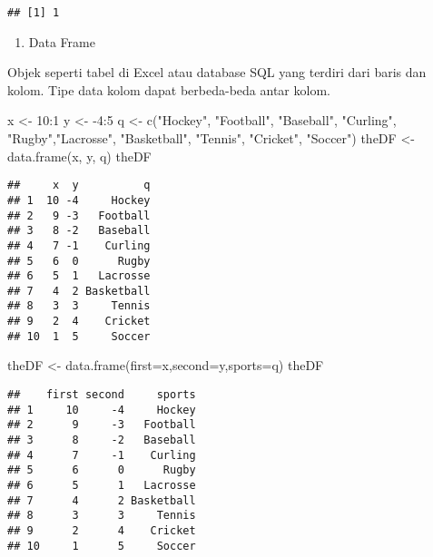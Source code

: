 \documentclass[
]{book}
\newenvironment{Shaded}{\begin{snugshade}}{\end{snugshade}}
\newcommand{\AttributeTok}[1]{\textcolor[rgb]{0.77,0.63,0.00}{#1}}
\newcommand{\DecValTok}[1]{\textcolor[rgb]{0.00,0.00,0.81}{#1}}
\newcommand{\FunctionTok}[1]{\textcolor[rgb]{0.00,0.00,0.00}{#1}}
\newcommand{\NormalTok}[1]{#1}
\newcommand{\OtherTok}[1]{\textcolor[rgb]{0.56,0.35,0.01}{#1}}
\newcommand{\SpecialCharTok}[1]{\textcolor[rgb]{0.00,0.00,0.00}{#1}}
\newcommand{\StringTok}[1]{\textcolor[rgb]{0.31,0.60,0.02}{#1}}
\providecommand{\tightlist}{%
  \setlength{\itemsep}{0pt}\setlength{\parskip}{0pt}}
\begin{document}
\begin{verbatim}
## [1] 1
\end{verbatim}

\begin{enumerate}
\def\labelenumi{\arabic{enumi}.}
\setcounter{enumi}{4}
\tightlist
\item
  Data Frame
\end{enumerate}

Objek seperti tabel di Excel atau database SQL yang terdiri dari baris dan kolom. Tipe data kolom dapat berbeda-beda antar kolom.

\begin{Shaded}
\begin{Highlighting}[]
\NormalTok{x }\OtherTok{\textless{}{-}} \DecValTok{10}\SpecialCharTok{:}\DecValTok{1}
\NormalTok{y }\OtherTok{\textless{}{-}} \SpecialCharTok{{-}}\DecValTok{4}\SpecialCharTok{:}\DecValTok{5}
\NormalTok{q }\OtherTok{\textless{}{-}} \FunctionTok{c}\NormalTok{(}\StringTok{"Hockey"}\NormalTok{, }\StringTok{"Football"}\NormalTok{, }\StringTok{"Baseball"}\NormalTok{, }\StringTok{"Curling"}\NormalTok{, }\StringTok{"Rugby"}\NormalTok{,}\StringTok{"Lacrosse"}\NormalTok{, }\StringTok{"Basketball"}\NormalTok{, }\StringTok{"Tennis"}\NormalTok{, }\StringTok{"Cricket"}\NormalTok{, }\StringTok{"Soccer"}\NormalTok{)}
\NormalTok{theDF }\OtherTok{\textless{}{-}} \FunctionTok{data.frame}\NormalTok{(x, y, q)}
\NormalTok{theDF}
\end{Highlighting}
\end{Shaded}

\begin{verbatim}
##     x  y          q
## 1  10 -4     Hockey
## 2   9 -3   Football
## 3   8 -2   Baseball
## 4   7 -1    Curling
## 5   6  0      Rugby
## 6   5  1   Lacrosse
## 7   4  2 Basketball
## 8   3  3     Tennis
## 9   2  4    Cricket
## 10  1  5     Soccer
\end{verbatim}

\begin{Shaded}
\begin{Highlighting}[]
\NormalTok{theDF }\OtherTok{\textless{}{-}} \FunctionTok{data.frame}\NormalTok{(}\AttributeTok{first=}\NormalTok{x,}\AttributeTok{second=}\NormalTok{y,}\AttributeTok{sports=}\NormalTok{q)}
\NormalTok{theDF}
\end{Highlighting}
\end{Shaded}

\begin{verbatim}
##    first second     sports
## 1     10     -4     Hockey
## 2      9     -3   Football
## 3      8     -2   Baseball
## 4      7     -1    Curling
## 5      6      0      Rugby
## 6      5      1   Lacrosse
## 7      4      2 Basketball
## 8      3      3     Tennis
## 9      2      4    Cricket
## 10     1      5     Soccer
\end{verbatim}
\end{document}

